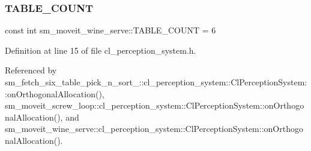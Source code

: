 \subsubsection{\texorpdfstring{T\+A\+B\+L\+E\+\_\+\+C\+O\+U\+NT}{TABLE\_COUNT}}
{\footnotesize\ttfamily const int sm\+\_\+moveit\+\_\+wine\+\_\+serve\+::\+T\+A\+B\+L\+E\+\_\+\+C\+O\+U\+NT = 6}



Definition at line 15 of file cl\+\_\+perception\+\_\+system.\+h.



Referenced by sm\+\_\+fetch\+\_\+six\+\_\+table\+\_\+pick\+\_\+n\+\_\+sort\+\_\+::cl\+\_\+perception\+\_\+system\+::\+Cl\+Perception\+System\+::on\+Orthogonal\+Allocation(), sm\+\_\+moveit\+\_\+screw\+\_\+loop\+::cl\+\_\+perception\+\_\+system\+::\+Cl\+Perception\+System\+::on\+Orthogonal\+Allocation(), and sm\+\_\+moveit\+\_\+wine\+\_\+serve\+::cl\+\_\+perception\+\_\+system\+::\+Cl\+Perception\+System\+::on\+Orthogonal\+Allocation().

